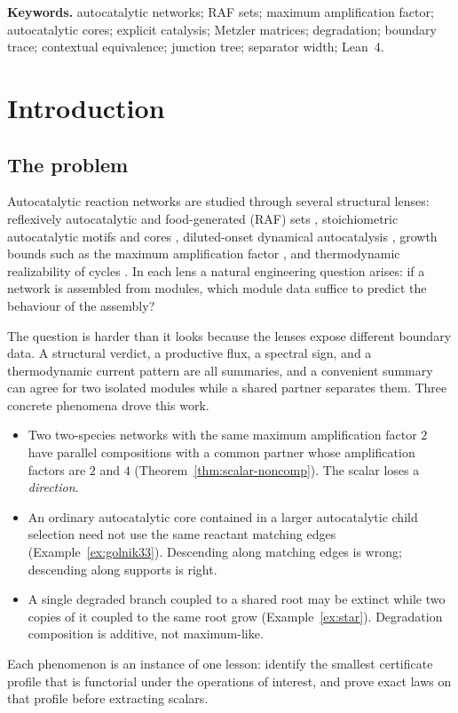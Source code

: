 \documentclass[11pt,a4paper]{article}
\theoremstyle{plain}
\theoremstyle{definition}
\theoremstyle{remark}
\begin{document}
\noindent\textbf{Keywords.} autocatalytic networks; RAF sets; maximum amplification factor; autocatalytic cores; explicit catalysis; Metzler matrices; degradation; boundary trace; contextual equivalence; junction tree; separator width; Lean~4.

\section{Introduction}\label{sec:intro}

\subsection{The problem}

Autocatalytic reaction networks are studied through several structural lenses: reflexively autocatalytic and food-generated (RAF) sets \cite{kauffman1986,hordijk2004,hordijk2014,steel2019}, stoichiometric autocatalytic motifs and cores \cite{blokhuis2020,golnik2026cores,golnik2026bridging}, diluted-onset dynamical autocatalysis \cite{unterberger2022,nandan2026}, growth bounds such as the maximum amplification factor \cite{gagrani2026maf}, and thermodynamic realizability of cycles \cite{kosc2025}. In each lens a natural engineering question arises: if a network is assembled from modules, which module data suffice to predict the behaviour of the assembly?

The question is harder than it looks because the lenses expose different boundary data. A structural verdict, a productive flux, a spectral sign, and a thermodynamic current pattern are all summaries, and a convenient summary can agree for two isolated modules while a shared partner separates them. Three concrete phenomena drove this work.
\begin{itemize}
\item Two two-species networks with the same maximum amplification factor $2$ have parallel compositions with a common partner whose amplification factors are $2$ and $4$ (Theorem~\ref{thm:scalar-noncomp}). The scalar loses a \emph{direction}.
\item An ordinary autocatalytic core contained in a larger autocatalytic child selection need not use the same reactant matching edges (Example~\ref{ex:golnik33}). Descending along matching edges is wrong; descending along supports is right.
\item A single degraded branch coupled to a shared root may be extinct while two copies of it coupled to the same root grow (Example~\ref{ex:star}). Degradation composition is additive, not maximum-like.
\end{itemize}
Each phenomenon is an instance of one lesson: identify the smallest certificate profile that is functorial under the operations of interest, and prove exact laws on that profile before extracting scalars.
\end{document}
